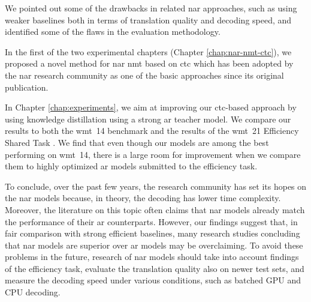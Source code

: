 We pointed out some of the drawbacks in related \ac{nar} approaches, such as
using weaker baselines both in terms of translation quality and decoding speed,
and identified some of the flaws in the evaluation methodology.

In the first of the two experimental chapters (Chapter \ref{chap:nar-nmt-ctc}),
we proposed a novel method for \ac{nar} \ac{nmt} based on \ac{ctc} which has
been adopted by the \ac{nar} research community as one of the basic approaches
since its original publication.

In Chapter \ref{chap:experiments}, we aim at improving our \acs{ctc}-based
approach by using knowledge distillation using a strong \ac{ar} teacher model.
We compare our results to both the \acs{wmt}~14 benchmark and the results of
the \acs{wmt}~21 Efficiency Shared Task \citep{heafield-etal-2021-findings}. We
find that even though our models are among the best performing on \acs{wmt}~14,
there is a large room for improvement when we compare them to highly optimized
\acl{ar} models submitted to the efficiency task.

To conclude, over the past few years, the research community has set its hopes
on the \ac{nar} models because, in theory, the decoding has lower time
complexity. Moreover, the literature on this topic often claims that \ac{nar}
models already match the performance of their \ac{ar} counterparts. However,
our findings suggest that, in fair comparison with strong efficient baselines,
many research studies concluding that \ac{nar} models are superior over \ac{ar}
models may be overclaiming. To avoid these problems in the future, research of
\ac{nar} models should take into account findings of the efficiency task,
evaluate the translation quality also on newer test sets, and measure the
decoding speed under various conditions, such as batched GPU and CPU decoding.



